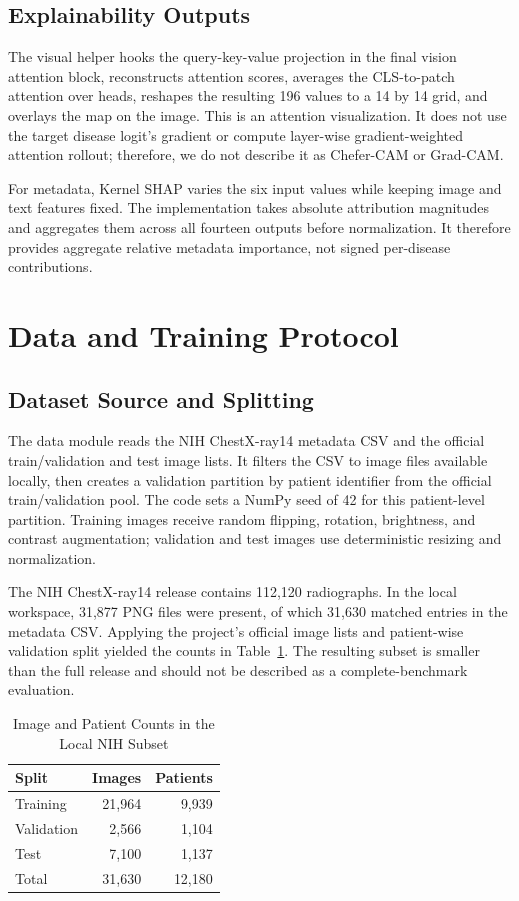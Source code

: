 \documentclass[conference]{IEEEtran}
\begin{document}
\subsection{Explainability Outputs}
The visual helper hooks the query-key-value projection in the final vision attention block, reconstructs attention scores, averages the CLS-to-patch attention over heads, reshapes the resulting 196 values to a 14 by 14 grid, and overlays the map on the image. This is an attention visualization. It does not use the target disease logit's gradient or compute layer-wise gradient-weighted attention rollout; therefore, we do not describe it as Chefer-CAM or Grad-CAM.

For metadata, Kernel SHAP varies the six input values while keeping image and text features fixed. The implementation takes absolute attribution magnitudes and aggregates them across all fourteen outputs before normalization. It therefore provides aggregate relative metadata importance, not signed per-disease contributions.

\section{Data and Training Protocol}
\subsection{Dataset Source and Splitting}
The data module reads the NIH ChestX-ray14 metadata CSV and the official train/validation and test image lists. It filters the CSV to image files available locally, then creates a validation partition by patient identifier from the official train/validation pool. The code sets a NumPy seed of 42 for this patient-level partition. Training images receive random flipping, rotation, brightness, and contrast augmentation; validation and test images use deterministic resizing and normalization.

The NIH ChestX-ray14 release contains 112,120 radiographs. In the local workspace, 31,877 PNG files were present, of which 31,630 matched entries in the metadata CSV. Applying the project's official image lists and patient-wise validation split yielded the counts in Table~\ref{tab:local_split}. The resulting subset is smaller than the full release and should not be described as a complete-benchmark evaluation.

\begin{table}[t]
\caption{Image and Patient Counts in the Local NIH Subset}
\label{tab:local_split}
\centering
\scriptsize
\begin{tabular}{lrr}
\toprule
Split & Images & Patients \\
\midrule
Training & 21,964 & 9,939 \\
Validation & 2,566 & 1,104 \\
Test & 7,100 & 1,137 \\
\midrule
Total & 31,630 & 12,180 \\
\bottomrule
\end{tabular}
\end{table}
\end{document}
